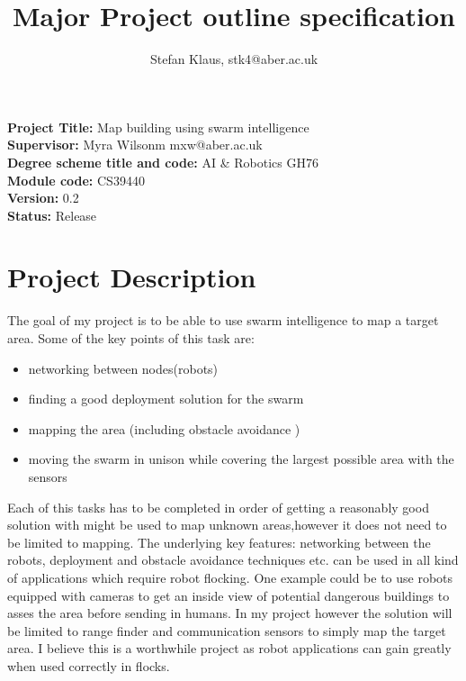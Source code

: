 \documentclass[10pt,a4paper]{article}
\author{Stefan Klaus, stk4@aber.ac.uk}
\title{Major Project outline specification }
\begin{document}

\maketitle
\begin{flushleft}
\textbf{Project Title:} Map building using swarm intelligence \\[3ex]
\textbf{Supervisor:} Myra Wilsonm mxw@aber.ac.uk\\[3ex]
\textbf{Degree scheme title and code:} AI \& Robotics GH76\\[3ex]
\textbf{Module code:} CS39440\\[3ex]
\textbf{Version:} 0.2\\[3ex]
\textbf{Status:} Release\\

\newpage

\section{Project Description }
The goal of my project is to be able to use swarm intelligence to map a target area. Some of the key points of this task are:

\begin{itemize}
\item networking between nodes(robots)
\item finding a good deployment solution for the swarm
\item mapping the area (including obstacle avoidance )
\item moving the swarm in unison while covering the largest possible area with the sensors
\end{itemize}

Each of this tasks has to be completed in order of getting a reasonably good solution with might be used to map unknown areas,however it does not need to be limited to mapping. The underlying key features: networking between the robots, deployment and obstacle avoidance techniques etc. can be used in all kind of applications which require robot flocking. One example could be to use robots equipped with cameras to get an inside view of potential dangerous buildings to asses the area before sending in humans. In my project however the solution will be limited to range finder and communication sensors to simply map the target area. I believe this is a worthwhile project as robot applications can gain greatly when used correctly in flocks.\\[3ex]


\end{flushleft}
\end{document}
